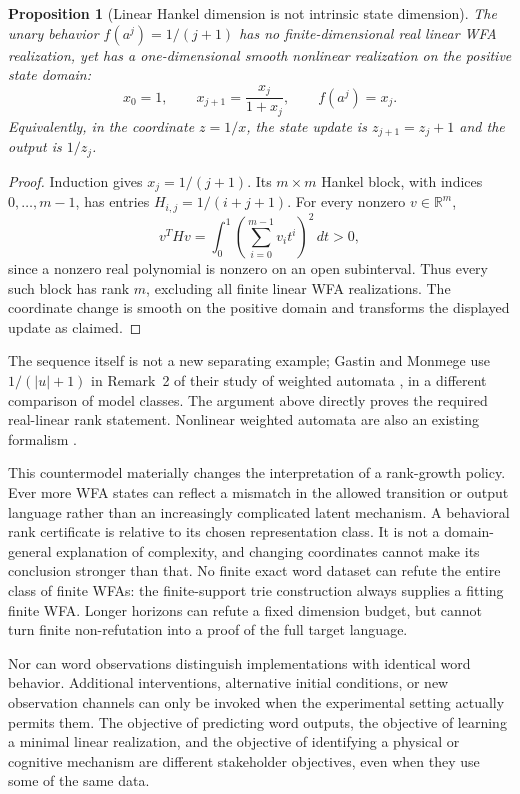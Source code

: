 \documentclass[11pt]{article}
\newtheorem{proposition}[theorem]{Proposition}
\theoremstyle{definition}
\theoremstyle{remark}
\begin{document}
\begin{proposition}[Linear Hankel dimension is not intrinsic state dimension]
\label{ce:hilbert}
The unary behavior $f(a^j)=1/(j+1)$ has no finite-dimensional real linear
WFA realization, yet has a one-dimensional smooth nonlinear realization on
the positive state domain:
\[
 x_0=1,\qquad x_{j+1}=\frac{x_j}{1+x_j},\qquad f(a^j)=x_j.
\]
Equivalently, in the coordinate $z=1/x$, the state update is
$z_{j+1}=z_j+1$ and the output is $1/z_j$.
\end{proposition}
\begin{proof}
Induction gives $x_j=1/(j+1)$. Its $m\times m$ Hankel block, with
indices $0,\ldots,m-1$, has entries $H_{i,j}=1/(i+j+1)$. For every
nonzero $v\in\mathbb R^m$,
\[
 v^THv=\int_0^1\left(\sum_{i=0}^{m-1}v_i t^i\right)^2\,dt>0,
\]
since a nonzero real polynomial is nonzero on an open subinterval.
Thus every such block has rank $m$, excluding all finite linear WFA
realizations. The coordinate change is smooth on the positive domain and
transforms the displayed update as claimed.
\end{proof}

The sequence itself is not a new separating example; Gastin and Monmege
use $1/(|u|+1)$ in Remark~2 of their study of weighted automata
\cite{ce:gastin2014}, in a different comparison of model classes. The
argument above directly proves the required real-linear rank statement.
Nonlinear weighted automata are also an existing formalism
\cite{ce:nonlinear2018}.

This countermodel materially changes the interpretation of a rank-growth
policy. Ever more WFA states can reflect a mismatch in the allowed
transition or output language rather than an increasingly complicated
latent mechanism. A behavioral rank certificate is relative to its chosen
representation class. It is not a domain-general explanation of complexity,
and changing coordinates cannot make its conclusion stronger than that.
No finite exact word dataset can refute the entire class of finite WFAs:
the finite-support trie construction always supplies a fitting finite WFA.
Longer horizons can refute a fixed dimension budget, but cannot turn finite
non-refutation into a proof of the full target language.

Nor can word observations distinguish implementations with identical word
behavior. Additional interventions, alternative initial conditions, or new
observation channels can only be invoked when the experimental setting
actually permits them. The objective of predicting word outputs, the
objective of learning a minimal linear realization, and the objective of
identifying a physical or cognitive mechanism are different stakeholder
objectives, even when they use some of the same data.
\end{document}
